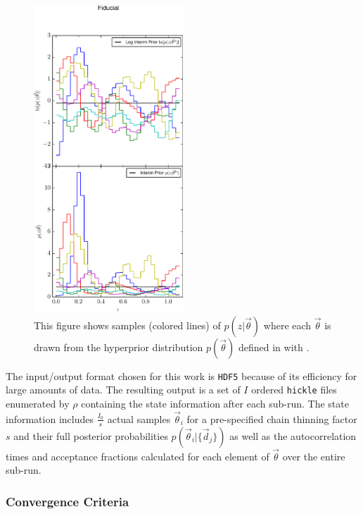 \begin{figure}
	\includegraphics[width=0.5\textwidth]{figures/chippr/null_priorsamps.pdf}
	\caption{This figure shows samples (colored lines) of $p(z|\vec{\theta})$ where each $\vec{\theta}$ is drawn from the hyperprior distribution $p(\vec{\theta})$ defined in  with .}
	\label{fig:prior}
\end{figure}

The input/output format chosen for this work is \texttt{HDF5} because of its efficiency for large amounts of data.  
The resulting output is a set of $I$ ordered \texttt{hickle} files enumerated by $\rho$ containing the state information after each sub-run.  
The state information includes $\frac{I_{0}}{s}$ actual samples $\vec{\theta}_{i}$ for a pre-specified chain thinning factor $s$ and their full posterior probabilities $p(\vec{\theta}_{i}|\{\vec{d}_{j}\})$ as well as the autocorrelation times and acceptance fractions calculated for each element of $\vec{\theta}$ over the entire sub-run.  

\subsubsection{Convergence Criteria}

